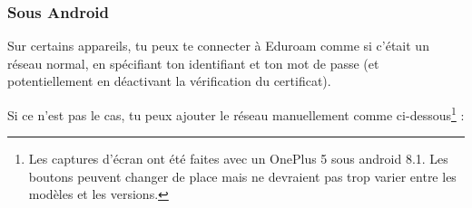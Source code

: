 \documentclass{../templates/enpc-ki/ki020}
\begin{document}
	\newpage



    \subsubsection{Sous Android}

	Sur certains appareils, tu peux te connecter à Eduroam comme si c'était un réseau normal, en spécifiant ton identifiant et ton mot de passe (et potentiellement en déactivant la vérification du certificat). 

	Si ce n'est pas le cas, tu peux ajouter le réseau manuellement comme ci-dessous\footnote{Les captures d'écran ont été faites avec un OnePlus 5 sous android 8.1. Les boutons peuvent changer de place mais ne devraient pas trop varier entre les modèles et les versions.} :
\end{document}
